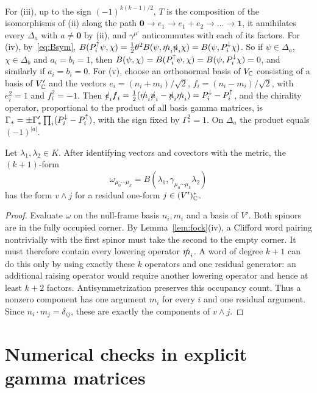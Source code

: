 For (iii), up to the sign $(-1)^{k(k-1)/2}$, $T$ is the composition of the isomorphisms of (ii) along the path $\mathbf 0\to e_1\to e_1+e_2\to\dots\to\mathbf 1$, it annihilates every $\Delta_a$ with $a\ne\mathbf 0$ by (ii), and $\gamma^{\mu'}$ anticommutes with each of its factors. For (iv), by~\eqref{eq:Bsym}, $B(P^{\uparrow}_i\psi,\chi)=\frac12\theta^2B(\psi,\slashed{m}_i\slashed{n}_i\chi)=B(\psi,P^{\downarrow}_i\chi)$. So if $\psi\in\Delta_a$, $\chi\in\Delta_b$ and $a_i=b_i=1$, then $B(\psi,\chi)=B(P^{\uparrow}_i\psi,\chi)=B(\psi,P^{\downarrow}_i\chi)=0$, and similarly if $a_i=b_i=0$. For (v), choose an orthonormal basis of $V_{\mathbb{C}}$ consisting of a basis of $V'_{\mathbb{C}}$ and the vectors $e_i=(n_i+m_i)/\sqrt2$, $f_i=(n_i-m_i)/\sqrt2$, with $e_i^2=1$ and $f_i^2=-1$. Then $\slashed e_i\slashed f_i=\frac12(\slashed{m}_i\slashed{n}_i-\slashed{n}_i\slashed{m}_i)=P^{\downarrow}_i-P^{\uparrow}_i$, and the chirality operator, proportional to the product of all basis gamma matrices, is $\Gamma_*=\pm\Gamma'_*\prod_i(P^{\downarrow}_i-P^{\uparrow}_i)$, with the sign fixed by $\Gamma_*^2=1$. On $\Delta_a$ the product equals $(-1)^{|a|}$.

\begin{lemma}\label{lem:nullcurrent}
Let $\lambda_1,\lambda_2\in K$. After identifying vectors and covectors with the metric, the $(k+1)$-form
\[
 \omega_{\mu_0\cdots\mu_k}
   =B(\lambda_1,\gamma_{\mu_0\cdots\mu_k}\lambda_2)
\]
has the form $v\wedge j$ for a residual one-form $j\in(V')^*_{\mathbb{C}}$.
\end{lemma}
\begin{proof}
Evaluate $\omega$ on the null-frame basis $n_i,m_i$ and a basis of $V'$. Both spinors are in the fully occupied corner. By Lemma~\ref{lem:fock}(iv), a Clifford word pairing nontrivially with the first spinor must take the second to the empty corner. It must therefore contain every lowering operator $\slashed{m}_i$. A word of degree $k+1$ can do this only by using exactly these $k$ operators and one residual generator: an additional raising operator would require another lowering operator and hence at least $k+2$ factors. Antisymmetrization preserves this occupancy count. Thus a nonzero component has one argument $m_i$ for every $i$ and one residual argument. Since $n_i\cdot m_j=\delta_{ij}$, these are exactly the components of $v\wedge j$.
\end{proof}

\section{Numerical checks in explicit gamma matrices}
\label{app:checks}


